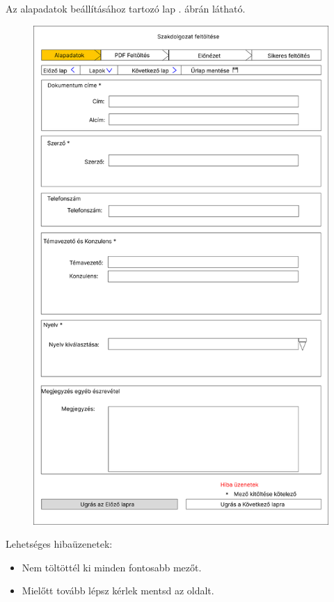 \documentclass[a4paper,12pt]{article}
\begin{document}
Az alapadatok beállításához tartozó lap . ábrán látható.

\begin{figure}
	\centering
	\includegraphics[width=\textwidth]{images/Web_pages/Title_Settings.png}
	\caption{}
	\label{fig:Title_Settings}
\end{figure}

Lehetséges hibaüzenetek:
\begin{itemize}
	\item Nem töltöttél ki minden fontosabb mezőt.
	\item Mielőtt tovább lépsz kérlek mentsd az oldalt.
\end{itemize}
\end{document}
